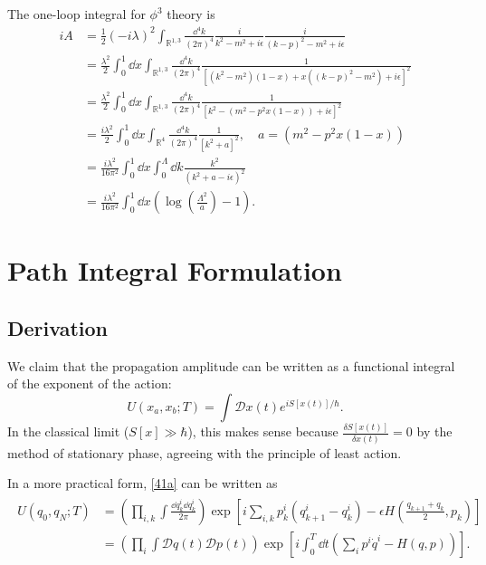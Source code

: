 \documentclass{article}
\begin{document}
The one-loop integral for $\phi^3$ theory is 
\begin{align*}
    iA&=\frac 12(-i\lambda)^2\int_{\mathbb R^{1,3}}\frac{\dd^4k}{(2\pi)^4}\frac{i}{k^2-m^2+i\epsilon}\frac{i}{(k-p)^2-m^2+i\epsilon}\\
    &=\frac{\lambda^2}{2}\int^1_0\dd x\int_{\mathbb R^{1,3}}\frac{\dd^4k}{(2\pi)^4}\frac{1}{[(k^2-m^2)(1-x)+x((k-p)^2-m^2)+i\epsilon]^2}\\
    &=\frac{\lambda^2}{2}\int^1_0\dd x\int_{\mathbb R^{1,3}}\frac{\dd^4k}{(2\pi)^4}\frac{1}{[k^2-(m^2-p^2x(1-x))+i\epsilon]^2}\\
    &=\frac{i\lambda^2}{2}\int^1_0\dd x\int_{\mathbb R^4}\frac{\dd^4k}{(2\pi)^4}\frac{1}{[k^2+a]^2},\quad a=(m^2-p^2x(1-x))\\
    &=\frac{i\lambda^2}{16\pi^2}\int^1_0\dd x\int^\Lambda_0\dd k\frac{k^2}{(k^2+a-i\epsilon)^2}\\
    &=\frac{i\lambda^2}{16\pi^2}\int^1_0\dd x\left(\log\left(\frac{\Lambda^2}{a}\right)-1\right).
\end{align*}


\pagebreak

\section{Path Integral Formulation}

\subsection{Derivation}

We claim that the propagation amplitude can be written as a functional integral of the exponent of the action:
\begin{equation}
    U(x_a,x_b;T)=\int\mathcal Dx(t)e^{iS[x(t)]/\hbar}.
    \label{41a}
\end{equation}
In the classical limit ($S[x]\gg\hbar$), this makes sense because $\frac{\delta S[x(t)]}{\delta x(t)}=0$ by the method of stationary phase, agreeing with the principle of least action. 

In a more practical form, \eqref{41a} can be written as 
\begin{align}
    \begin{split}
        U(q_0,q_N;T)&=\left(\prod_{i,k}\int\frac{\dd q^i_k\dd q^i_k}{2\pi}\right)\exp\left[i\sum_{i,k}p^i_k(q^i_{k+1}-q^i_k)-\epsilon H\left(\frac{q_{k+1}+q_k}{2},p_k\right)\right]\\
        &=\left(\prod_i\int\mathcal Dq(t)\mathcal Dp(t)\right)\exp\left[i\int^T_0\dd t\left(\sum_ip^i\dot q^i-H(q,p)\right)\right].
    \end{split}
\end{align}
\end{document}
